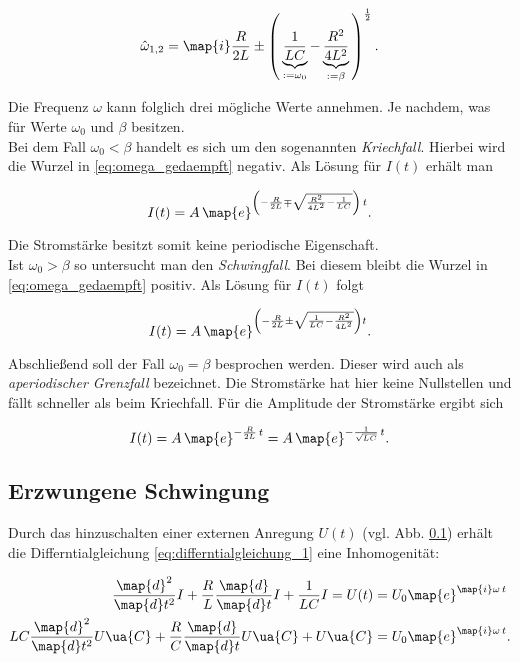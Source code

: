 \begin{equation}
  \label{eq:omega_gedaempft}
  \hat{\omega}_{1,2}=\map{i}\frac{R}{2L}\pm\left(\,\underbrace{\frac{1}{LC}}_{:=\omega_0}-\underbrace{\frac{R^2}{4L^2}}_{:=\beta}\,\right)^{\frac{1}{2}}.
\end{equation}

 Die Frequenz $\omega$ kann folglich drei mögliche Werte annehmen.
 Je nachdem, was für Werte $\omega_0$ und $\beta$ besitzen.
\\

Bei dem Fall $\omega_0<\beta$ handelt es sich um den sogenannten \emph{Kriechfall}.
 Hierbei wird die Wurzel in \eqref{eq:omega_gedaempft} negativ. Als Lösung für
 $I(t)$ erhält man

\begin{equation*}
     I(t)=A\,\map{e}^{\left(-\frac{R}{2L}\mp\sqrt{\frac{R^2}{4L^2}-\frac{1}{LC}}\right)\,t}.
\end{equation*}

Die Stromstärke besitzt somit keine periodische Eigenschaft.
\\

Ist $\omega_0>\beta$ so untersucht man den \emph{Schwingfall}.
Bei diesem bleibt die Wurzel in \eqref{eq:omega_gedaempft} positiv. Als
Lösung für $I(t)$ folgt

\begin{equation*}
  I(t)=A\,\map{e}^{\left(-\frac{R}{2L}\pm\sqrt{{\frac{1}{LC}}-\frac{R^2}{4L^2}}\right)t}.
\end{equation*}

Abschließend soll der Fall $\omega_0=\beta$ besprochen werden.
Dieser wird auch als \emph{aperiodischer Grenzfall} bezeichnet.
Die Stromstärke hat hier keine Nullstellen und fällt schneller als
beim Kriechfall.
Für die Amplitude der Stromstärke ergibt sich

\begin{equation}
  \label{eq:ap_grenz}
  I(t)=A\,\map{e}^{-\frac{R}{2L}\,t}=A\,\map{e}^{-\frac{1}{\sqrt{LC}}\,t}.
\end{equation}

\subsection{Erzwungene Schwingung}

Durch das hinzuschalten einer externen Anregung $U(t)$ (vgl. Abb. \ref{})
erhält die Differntialgleichung \eqref{eq:differntialgleichung_1} eine
Inhomogenität:

\begin{align}
  \frac{\map{d}^2}{\map{d}t^2}I+\frac{R}{L}\frac{\map{d}}{\map{d}t}I+\frac{1}{LC}I=U(t)&=U_0\map{e}^{\map{i}\omega\, t}\notag \\
  LC\frac{\map{d}^2}{\map{d}t^2}U\ua{C}+\frac{R}{C}\frac{\map{d}}{\map{d}t}U\ua{C}+U\ua{C}&=U_0\map{e}^{\map{i}\omega\, t}. \label{eq:dgl_2}
\end{align}

